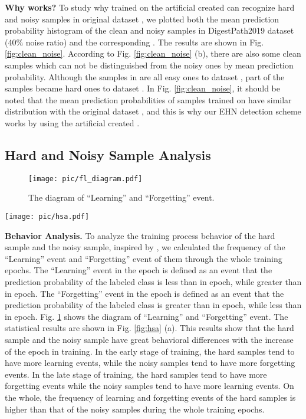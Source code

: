 {\textbf{Why  works?} To study why  trained on the artificial created  can recognize hard and noisy samples in original dataset , we plotted both the mean prediction probability histogram of the clean and noisy samples in DigestPath2019 dataset (40\% noise ratio)  and the corresponding . The results are shown in Fig. \ref{fig:clean_noise}. According to Fig. \ref{fig:clean_noise} (b), there are also some clean samples which can not be distinguished from the noisy ones by mean prediction probability. Although the samples in  are all easy ones to dataset , part of the samples became hard ones to dataset . In Fig. \ref{fig:clean_noise}, it should be noted that the mean prediction probabilities of samples trained on  have similar distribution with the original dataset , and this is why our EHN detection scheme works by using the artificial created .}




\subsection{Hard and Noisy Sample Analysis}

\begin{figure}[]
  \centering
  \texttt{[image: pic/fl\_diagram.pdf]}
\caption{{The diagram of ``Learning'' and ``Forgetting'' event.}}
  \label{fig:fl_diagram}
\end{figure}

\begin{figure*}[hbt]
  \centering
  \texttt{[image: pic/hsa.pdf]}
\caption{(a) The forgetting and learning event frequency histogram. (b) The gradient absolute value frequency histogram.} 
  \label{fig:hsa}
\end{figure*}



\textbf{Behavior Analysis.} To analyze the training process behavior of the hard sample and the noisy sample, inspired by \cite{toneva2018empirical}, we calculated the frequency of the ``Learning'' event and ``Forgetting'' event of them through the whole training epochs. The ``Learning'' event in the  epoch is defined as an event that the prediction probability of the labeled class is less than  in  epoch, while greater than  in  epoch. The ``Forgetting'' event in the  epoch is defined as an event that the prediction probability of the labeled class is greater than  in  epoch, while less than  in  epoch. Fig. \ref{fig:fl_diagram} shows the diagram of ``Learning'' and ``Forgetting'' event. The statistical results are shown in Fig. \ref{fig:hsa} (a). This results show that the hard sample and the noisy sample have great behavioral differences with the increase of the epoch in training. In the early stage of training, the hard samples tend to have more learning events, while the noisy samples tend to have more forgetting events. In the late stage of training, the hard samples tend to have more forgetting events while the noisy samples tend to have more learning events. On the whole, the frequency of learning and forgetting events of the hard samples is higher than that of the noisy samples during the whole training epochs.

